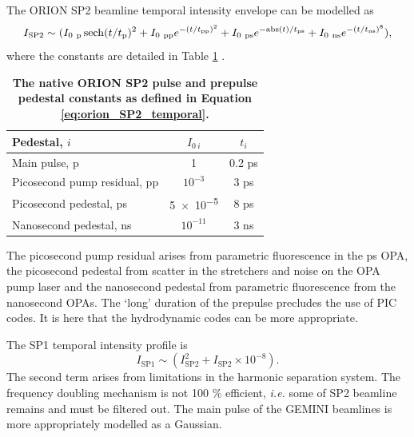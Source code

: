 The ORION SP2 beamline temporal intensity envelope can be modelled as
\begin{equation}\label{eq:orion_SP2_temporal}
	I_\mathrm{SP2} \sim (I_{0 \ \mathrm{p}}\sech(t/t_\mathrm{p})^2 + I_{0 \ \mathrm{pp}}e^{-(t/t_\mathrm{pp})^2} + I_{0 \ \mathrm{ps}}e^{-\mathrm{abs}(t)/t_\mathrm{ps}} + I_{0 \ \mathrm{ns}}e^{-(t/t_\mathrm{ns})^8}),
\end{equation}
where the constants are detailed in Table \ref{tab:orion_pedestals} \cite{dhillierModelORIONContrast22}.
\begin{table}[]
	\centering
	\begin{tabular}{lcc}
		\hline\hline
		Pedestal, $i$                & $I_{0 \ i}$ & $t_i$  \\ \hline
		Main pulse, p                & 1           & 0.2 ps \\
		Picosecond pump residual, pp & $10^{-3}$   & 3 ps   \\
		Picosecond pedestal, ps      & \num{5e-5}  & 8 ps   \\
		Nanosecond pedestal, ns      & $10^{-11}$  & 3 ns  \\ \hline \hline
	\end{tabular}
	\caption{\textbf{The native ORION SP2 pulse and prepulse pedestal constants as defined in Equation \ref{eq:orion_SP2_temporal}.}}
	\label{tab:orion_pedestals}
\end{table}
The picosecond pump residual arises from parametric fluorescence in the ps OPA, the picosecond pedestal from scatter in the stretchers and noise on the OPA pump laser and the nanosecond pedestal from parametric fluorescence from the nanosecond OPAs. The `long' duration of the prepulse precludes the use of PIC codes. It is here that the hydrodynamic codes can be more appropriate.

The SP1 temporal intensity profile is
\begin{equation}
	I_\mathrm{SP1} \sim (I_\mathrm{SP2}^2 + I_\mathrm{SP2} \times 10^{-8}).
\end{equation}
The second term arises from limitations in the harmonic separation system. The frequency doubling mechanism is not 100 \% efficient, \textit{i.e.} some of SP2 beamline remains and must be filtered out. The main pulse of the GEMINI beamlines is more appropriately modelled as a Gaussian.

